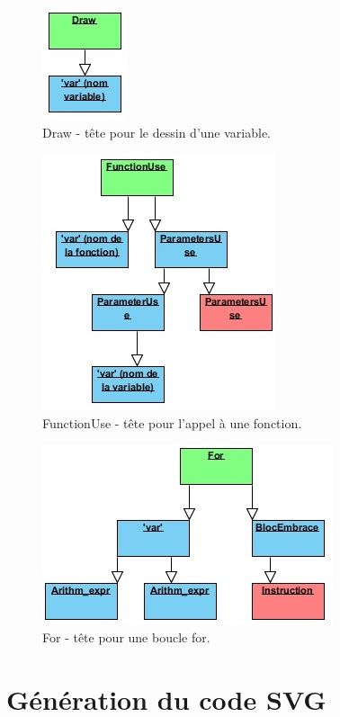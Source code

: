 \documentclass[11pt]{report} %
\begin{document}
\begin{figure}[h]
    \centering
    \includegraphics[scale=1]{img/draw.jpg}
    \caption{\label{CG} Draw - tête pour le dessin d'une variable.}
\end{figure}
\begin{figure}[h]
    \centering
    \includegraphics[scale=1]{img/fonctionuse.jpg}
    \caption{\label{CG} FunctionUse - tête pour l'appel à une fonction.}
\end{figure}
\begin{figure}[h]
    \centering
    \includegraphics[scale=1]{img/for.jpg}
    \caption{\label{CG} For - tête pour une boucle for.}
\end{figure}




\chapter{Génération du code SVG}
\end{document}
